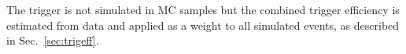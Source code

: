 The trigger is not simulated in MC samples but the combined trigger efficiency
is estimated from data and applied as a weight to all simulated events, as described in Sec.~\ref{sec:trigeff}.

%
%
%
%
